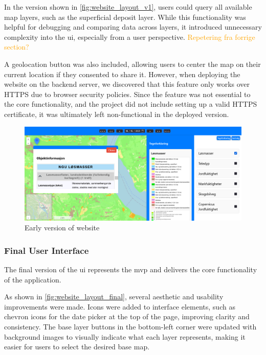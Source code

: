 In the version shown in \autoref{fig:website_layout_v1}, users could query all available map layers, such as the superficial deposit layer. While this functionality was helpful for debugging and comparing data across layers, it introduced unnecessary complexity into the \acrshort{ui}, especially from a user perspective. \textcolor{orange}{Repetering fra forrige section?}

A geolocation button was also included, allowing users to center the map on their current location if they consented to share it. However, when deploying the website on the backend server, we discovered that this feature only works over HTTPS due to browser security policies. Since the feature was not essential to the core functionality, and the project did not include setting up a valid HTTPS certificate, it was ultimately left non-functional in the deployed version.

\begin{figure}[h]
    \centering
    \includegraphics[width=1\linewidth]{figures/website_layout_v1.pdf}
    \caption{Early version of website}
    \label{fig:website_layout_v1}
\end{figure}

\subsubsection*{Final User Interface}

The final version of the \acrshort{ui} represents the \acrfull{mvp} and delivers the core functionality of the application.

As shown in \autoref{fig:website_layout_final}, several aesthetic and usability improvements were made. Icons were added to interface elements, such as chevron icons for the date picker at the top of the page, improving clarity and consistency. The base layer buttons in the bottom-left corner were updated with background images to visually indicate what each layer represents, making it easier for users to select the desired base map.

